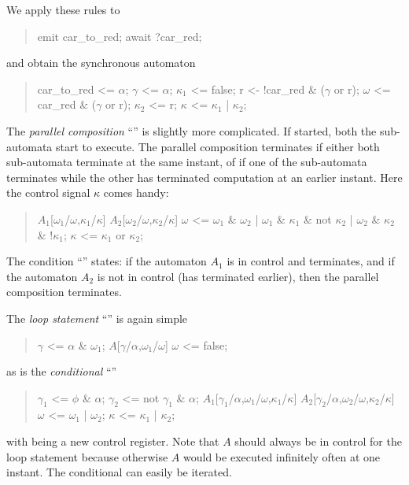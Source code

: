 We apply these rules to
\begin{quote}
\BEP
    emit car\_to\_red;
    await ?car\_red;
\EEP
\end{quote}
and obtain the synchronous automaton
\begin{quote}
\BEP
car\_to\_red <= $\alpha$;
       $\gamma$  <= $\alpha$;
       $\kappa_{1}$ <= false;
       r  <- !car\_red \& ($\gamma$ or r);
       $\omega$  <= car\_red  \& ($\gamma$ or r);
       $\kappa_{2}$ <= r;
       $\kappa$  <= $\kappa_{1}$ | $\kappa_{2}$;    
\EEP
\end{quote}

The \emph{parallel composition} ``'' is slightly more complicated. If started, both the sub-automata start to execute. The parallel composition
terminates if either both sub-automata terminate at the same instant, of if
one of the sub-automata terminates while the other has terminated computation at an earlier instant. Here the control signal $\kappa$ comes handy:
\begin{quote}
\BEP
    $A_{1}$[$\omega_{1}$/$\omega$,$\kappa_1$/$\kappa$]
    $A_{2}$[$\omega_{2}$/$\omega$,$\kappa_2$/$\kappa$]
    $\omega$ <=    $\!\omega_1$ \& $\omega_2$ 
         | $\omega_1$ \& $\kappa_1$ \& not $\kappa_2$ 
         | $\omega_2$ \& $\kappa_2$ \&  !$\kappa_1$;
    $\kappa$ <= $\kappa_1$ or $\kappa_2$;
\EEP
\end{quote}
The condition  ``''
states: if the automaton $A_{1}$ is in control and terminates, and
if the automaton $A_{2}$ is not in control (has terminated earlier),
then the parallel composition terminates. 

The \emph{loop statement} ``'' is again simple
\begin{quote}
\BEP
   $\gamma$ <= $\alpha$ \& $\omega_{1}$;
   $A$[$\gamma$/$\alpha$,$\omega_{1}$/$\omega$]
   $\omega$ <= false;
\EEP
\end{quote}
as is the \emph{conditional} ``''
\begin{quote}
\BEP
   $\gamma_{1}$ <= $\phi$ \& $\alpha$;
   $\gamma_{2}$ <= not $\gamma_{1}$ \& $\alpha$;
   $A_{1}$[$\gamma_{1}$/$\alpha$,$\omega_{1}$/$\omega$,$\kappa_{1}$/$\kappa$]
   $A_{2}$[$\gamma_{2}$/$\alpha$,$\omega_{2}$/$\omega$,$\kappa_{2}$/$\kappa$]
   $\omega$ <= $\omega_{1}$ | $\omega_{2}$;
   $\kappa$ <= $\kappa_{1}$ | $\kappa_{2}$;
\EEP
\end{quote}
with  being a new control register. Note that $A$ should always be in control for the loop statement because otherwise $A$ would be executed infinitely often at one instant. The conditional can easily be iterated.

